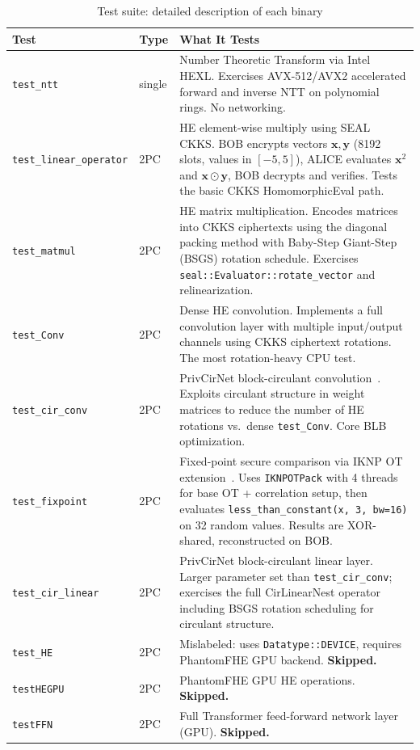 \begin{table}[ht]
\centering
\caption{Test suite: detailed description of each binary}
\label{tab:tests-detail}
\begin{tabular}{llp{7.5cm}}
\toprule
Test & Type & What It Tests \\
\midrule
\texttt{test\_ntt}
  & single
  & Number Theoretic Transform via Intel HEXL. Exercises AVX-512/AVX2 accelerated forward and inverse NTT on polynomial rings. No networking. \\
\addlinespace
\texttt{test\_linear\_operator}
  & 2PC
  & HE element-wise multiply using SEAL CKKS. BOB encrypts vectors $\mathbf{x}, \mathbf{y}$ (8192 slots, values in $[-5,5]$), ALICE evaluates $\mathbf{x}^2$ and $\mathbf{x} \odot \mathbf{y}$, BOB decrypts and verifies. Tests the basic CKKS HomomorphicEval path. \\
\addlinespace
\texttt{test\_matmul}
  & 2PC
  & HE matrix multiplication. Encodes matrices into CKKS ciphertexts using the diagonal packing method with Baby-Step Giant-Step (BSGS) rotation schedule. Exercises \texttt{seal::Evaluator::rotate\_vector} and relinearization. \\
\addlinespace
\texttt{test\_Conv}
  & 2PC
  & Dense HE convolution. Implements a full convolution layer with multiple input/output channels using CKKS ciphertext rotations. The most rotation-heavy CPU test. \\
\addlinespace
\texttt{test\_cir\_conv}
  & 2PC
  & PrivCirNet block-circulant convolution~\cite{xu2024privcirnet}. Exploits circulant structure in weight matrices to reduce the number of HE rotations vs.\ dense \texttt{test\_Conv}. Core BLB optimization. \\
\addlinespace
\texttt{test\_fixpoint}
  & 2PC
  & Fixed-point secure comparison via IKNP OT extension~\cite{iknp2003}. Uses \texttt{IKNPOTPack} with 4 threads for base OT + correlation setup, then evaluates \texttt{less\_than\_constant(x, 3, bw=16)} on 32 random values. Results are XOR-shared, reconstructed on BOB. \\
\addlinespace
\texttt{test\_cir\_linear}
  & 2PC
  & PrivCirNet block-circulant linear layer. Larger parameter set than \texttt{test\_cir\_conv}; exercises the full CirLinearNest operator including BSGS rotation scheduling for circulant structure. \\
\addlinespace
\texttt{test\_HE}
  & 2PC
  & Mislabeled: uses \texttt{Datatype::DEVICE}, requires PhantomFHE GPU backend. \textbf{Skipped.} \\
\addlinespace
\texttt{testHEGPU}
  & 2PC
  & PhantomFHE GPU HE operations. \textbf{Skipped.} \\
\addlinespace
\texttt{testFFN}
  & 2PC
  & Full Transformer feed-forward network layer (GPU). \textbf{Skipped.} \\
\bottomrule
\end{tabular}
\end{table}

